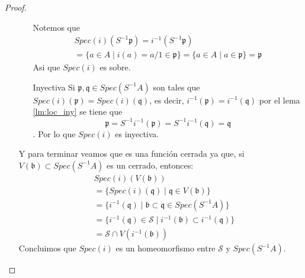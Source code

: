 \documentclass[14pt]{extarticle}
\begin{document}
\begin{proof}
\begin{enumerate}
\begin{enumerate}
            Notemos que 
            \begin{multline*}
                Spec(i)(S^{-1}\mathfrak{p})=i^{-1}(S^{-1}\mathfrak{p})\\
                =\{a\in A\mid i(a)=a/1 \in \mathfrak{p}\}
                =\{a \in A\mid a\in \mathfrak{p}\} = \mathfrak{p}
            \end{multline*}
            Asi que $Spec(i)$ es sobre.
            \item[Inyectiva]Si $\mathfrak{p}, \mathfrak{q}\in Spec(S^{-1}A)$
            son tales que $Spec(i)(\mathfrak{p})=Spec(i)(\mathfrak{q})$, es decir,
            $i^{-1}(\mathfrak{p})= i^{-1}(\mathfrak{q})$ por el lema \ref{lm:loc_iny}
            se tiene que 
            $$\mathfrak{p}=S^{-1}i^{-1}(\mathfrak{p})
            =S^{-1}i^{-1}(\mathfrak{q})=\mathfrak{q}$$.
            Por lo que $Spec(i)$ es inyectiva.
        \end{enumerate}
        Y para terminar veamos que es una función cerrada ya que,
        si $V(\mathfrak{b})\subset Spec(S^{-1}A)$ es un cerrado, entonces:
        \begin{align*}
            &Spec(i)(V(\mathfrak{b}))\\
            &=\{Spec(i)(\mathfrak{q}) \mid \mathfrak{q}\in V(\mathfrak{b})\}\\
            &=\{i^{-1}(\mathfrak{q})\mid \mathfrak{b}\subset \mathfrak{q}\in Spec(S^{-1}A)\}\\
            &=\{i^{-1}(\mathfrak{q})\in \mathcal{S}\mid i^{-1}(\mathfrak{b})\subset i^{-1}(\mathfrak{q})\}\\
            &= \mathcal{S}\cap V(i^{-1}(\mathfrak{b}))
        \end{align*}
        Concluimos que $Spec(i)$ es un homeomorfismo entre 
        $\mathcal{S}$ y $Spec(S^{-1}A)$.
    \end{enumerate}
\end{proof}
\end{document}
